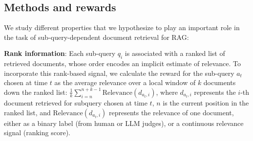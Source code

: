 \subsection{Methods and rewards}\label{sec:rewards}
We study different properties that we hypothesize to play an important role in the task of sub-query-dependent document retrieval for RAG:


\noindent\textbf{Rank information}: Each sub-query \(q_i\) is associated with a ranked list of retrieved documents, whose order encodes an implicit estimate of relevance. To incorporate this rank-based signal, we calculate the reward for the sub-query \(a_t\) chosen at time \(t\) as the average relevance over a local window of \(k\) documents down the ranked list: \(\frac{1}{k} \sum_{i=n}^{n+k-1} \text{Relevance}(d_{a_t, i})\), where \(d_{a_t, i}\) represents the \(i\)-th document retrieved for subquery chosen at time \(t\), \(n\) is the current position in the ranked list, and $\text{Relevance}(d_{a_t, i})$ represents the relevance of one document, either as a binary label (from human or LLM judges), or a continuous relevance signal (ranking score).

